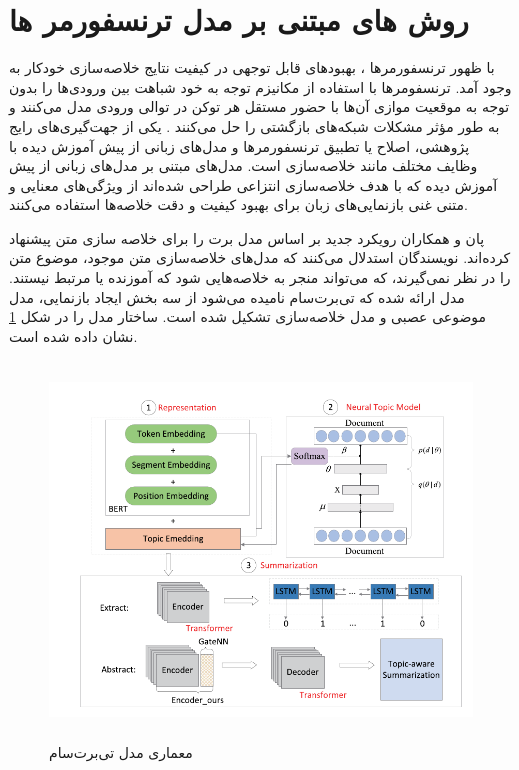 



\section{روش ‌های مبتنی بر مدل ترنسفورمر ها}
با ظهور ترنسفورمرها
 ، بهبودهای قابل توجهی در کیفیت نتایج خلاصه‌سازی خودکار به وجود آمد. ترنسفومرها با استفاده از مکانیزم توجه به خود‏
شباهت بین ورودی‌ها را بدون توجه به موقعیت موازی آن‌ها با حضور مستقل هر توکن در توالی ورودی مدل می‌کنند و به طور مؤثر مشکلات شبکه‌های بازگشتی را حل می‌کنند
\cite{vaswani2017attention}
. یکی از جهت‌گیری‌های رایج پژوهشی، اصلاح یا تطبیق ترنسفورمرها و مدل‌های زبانی از پیش آموزش دیده با وظایف مختلف مانند خلاصه‌سازی است. مدل‌های مبتنی بر مدل‌های زبانی از پیش آموزش دیده که با هدف خلاصه‌سازی انتزاعی طراحی شده‌اند از ویژگی‌های معنایی و متنی غنی بازنمایی‌های زبان برای بهبود کیفیت و دقت خلاصه‌‌ها استفاده می‌کنند.



پان و همکاران رویکرد جدید بر اساس مدل برت را برای خلاصه سازی متن پیشنهاد کرده‌اند. نویسندگان استدلال می‌کنند که مدل‌های خلاصه‌سازی متن موجود، موضوع متن را در نظر نمی‌گیرند، که می‌تواند منجر به خلاصه‌هایی شود که آموزنده یا مرتبط نیستند.  
مدل ارائه شده که تی‌برت‌سام
 نامیده می‌شود از سه بخش ایجاد بازنمایی، مدل موضوعی عصبی 
و مدل خلاصه‌سازی تشکیل شده است. ساختار مدل را در شکل  \ref{fig:tBert_model}  نشان داده شده است.
 \begin{figure}[!h]
	\begin{center}
		\includegraphics[height=10cm]{tbertsum_framework.png}
	\end{center}
	\caption{معماری  مدل تی‌برت‌سام \cite{Ma2022TBERTSumTT}}
	\label{fig:tBert_model}
	\medskip
	\small
\end{figure}


